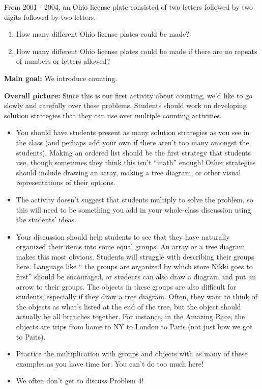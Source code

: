 \documentclass[nooutcomes,noauthor]{ximera}
\begin{document}
\begin{problem}
From 2001 - 2004, an Ohio license plate consisted of two letters followed by two digits followed by two letters.
\begin{enumerate}
\item How many different Ohio license plates could be made?
\item How many different Ohio license plates could be made if there are no repeats of numbers or letters allowed?
\end{enumerate}
\end{problem}

\newpage

\begin{instructorNotes}

{\bf Main goal:} We introduce counting. 

{\bf Overall picture:} Since this is our first activity about counting, we'd like to go slowly and carefully over these problems. Students should work on developing solution strategies that they can use over multiple counting activities.

\begin{itemize}
	\item You should have students present as many solution strategies as you see in the class (and perhaps add your own if there aren't too many amongst the students). Making an ordered list should be the first strategy that students use, though sometimes they think this isn't ``math'' enough! Other strategies should include drawing an array, making a tree diagram, or other visual representations of their options.
	\item The activity doesn't suggest that students multiply to solve the problem, so this will need to be something you add in your whole-class discussion using the students' ideas.
	\item Your discussion should help students to see that they have naturally organized their items into some equal groups. An array or a tree diagram makes this most obvious. Students will struggle with describing their groups here. Language like `` the groups are organized by which store Nikki goes to first'' should be encouraged, or students can also draw a diagram and put an arrow to their groups. The objects in these groups are also difficult for students, especially if they draw a tree diagram. Often, they want to think of the objects as what's listed at the end of the tree, but the object should actually be all branches together. For instance, in the Amazing Race, the objects are trips from home to NY to London to Paris (not just how we got to Paris).
	\item Practice the multiplication with groups and objects with as many of these examples as you have time for. You can't do too much here!
	\item We often don't get to discuss Problem 4!
\end{itemize}


\end{instructorNotes}
\end{document}
